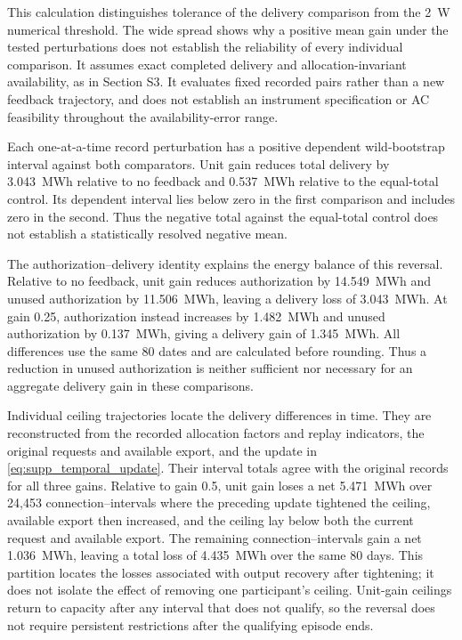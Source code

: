 \documentclass[11pt]{article}
\begin{document}
This calculation distinguishes tolerance of the delivery comparison from the
2~W numerical threshold. The wide spread shows why a positive mean gain under
the tested perturbations does not establish the reliability of every individual
comparison. It assumes exact completed delivery and allocation-invariant
availability, as in Section S3. It evaluates fixed recorded pairs rather than
a new feedback trajectory, and does not establish an instrument specification
or AC feasibility throughout the availability-error range.

Each one-at-a-time record perturbation has a positive dependent wild-bootstrap
interval against both comparators. Unit gain reduces total delivery by
3.043~MWh relative to no feedback and 0.537~MWh relative to the equal-total
control. Its dependent interval lies below zero in the first comparison and
includes zero in the second. Thus the negative total against the equal-total
control does not establish a statistically resolved negative mean.

The authorization--delivery identity explains the energy balance of this
reversal. Relative to no feedback, unit gain reduces authorization by
14.549~MWh and unused authorization by 11.506~MWh, leaving a delivery loss of
3.043~MWh. At gain 0.25, authorization instead increases by 1.482~MWh and
unused authorization by 0.137~MWh, giving a delivery gain of 1.345~MWh.
All differences use the same 80 dates and are calculated before rounding.
Thus a reduction in unused authorization is neither sufficient nor necessary
for an aggregate delivery gain in these comparisons.

Individual ceiling trajectories locate the delivery differences in time.
They are reconstructed from the recorded allocation factors and replay
indicators, the original requests and available export, and the update in
\eqref{eq:supp_temporal_update}. Their interval totals agree with the original
records for all three gains. Relative to gain 0.5, unit gain loses a net
5.471~MWh over 24,453 connection--intervals where the preceding update tightened
the ceiling, available export then increased, and the ceiling lay below both
the current request and available export. The remaining connection--intervals
gain a net 1.036~MWh, leaving a total loss of 4.435~MWh over the same 80 days.
This partition locates the losses associated with output recovery after
tightening; it does not isolate the effect of removing one participant's
ceiling. Unit-gain ceilings return to capacity after any interval that does
not qualify, so the reversal does not require persistent restrictions after
the qualifying episode ends.
\end{document}
